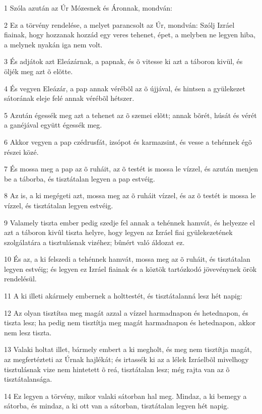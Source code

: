 \par 1 Szóla azután az Úr Mózesnek és Áronnak, mondván:
\par 2 Ez a törvény rendelése, a melyet parancsolt az Úr, mondván: Szólj Izráel fiainak, hogy hozzanak hozzád egy veres tehenet, épet, a melyben ne legyen hiba, a melynek nyakán iga nem volt.
\par 3 És adjátok azt Eleázárnak, a papnak, és õ vitesse ki azt a táboron kivül, és öljék meg azt õ elõtte.
\par 4 És vegyen Eleázár, a pap annak vérébõl az õ újjával, és hintsen a gyülekezet sátorának eleje felé annak vérébõl hétszer.
\par 5 Azután égessék meg azt a tehenet az õ szemei elõtt; annak bõrét, húsát és vérét a ganéjával együtt égessék meg.
\par 6 Akkor vegyen a pap czédrusfát, izsópot és karmazsint, és vesse a tehénnek égõ részei közé.
\par 7 És mossa meg a pap az õ ruháit, az õ testét is mossa le vízzel, és azután menjen be a táborba, és tisztátalan legyen a pap estvéig.
\par 8 Az is, a ki megégeti azt, mossa meg az õ ruháit vízzel, és az õ testét is mossa le vízzel, és tisztátalan legyen estvéig.
\par 9 Valamely tiszta ember pedig szedje fel annak a tehénnek hamvát, és helyezze el azt a táboron kivûl tiszta helyre, hogy legyen az Izráel fiai gyülekezetének szolgálatára a tisztulásnak vizéhez; bûnért való áldozat ez.
\par 10 És az, a ki felszedi a tehénnek hamvát, mossa meg az õ ruháit, és tisztátalan legyen estvéig; és legyen ez Izráel fiainak és a köztök tartózkodó jövevénynek örök rendelésül.
\par 11 A ki illeti akármely embernek a holttestét, és tisztátalanná lesz hét napig:
\par 12 Az olyan tisztítsa meg magát azzal a vízzel harmadnapon és hetednapon, és tiszta lesz; ha pedig nem tisztítja meg magát harmadnapon és hetednapon, akkor nem lesz tiszta.
\par 13 Valaki holtat illet, bármely embert a ki megholt, és meg nem tisztítja magát, az megfertézteti az Úrnak hajlékát; és irtassék ki az a lélek Izráelbõl mivelhogy tisztulásnak vize nem hintetett õ reá, tisztátalan lesz; még rajta van az õ tisztátalansága.
\par 14 Ez legyen a törvény, mikor valaki sátorban hal meg. Mindaz, a ki bemegy a sátorba, és mindaz, a ki ott van a sátorban, tisztátalan legyen hét napig.
